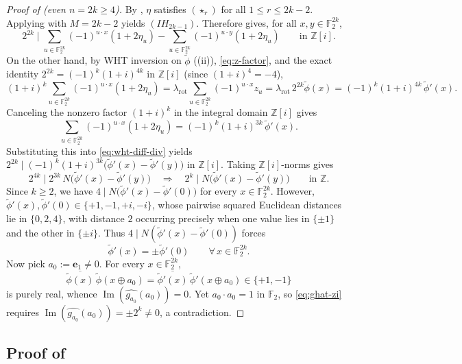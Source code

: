 \documentclass[11pt,a4paper]{article}
\theoremstyle{plain}
\theoremstyle{definition}
\theoremstyle{remark}
\newcommand{\Z}{\mathbb{Z}}
\newcommand{\F}{\mathbb{F}}
\newcommand{\Zi}{\mathbb{Z}[i]}
\newcommand{\ImPart}{\operatorname{Im}}
\numberwithin{equation}{section}
\begin{document}
\begin{proof}[Proof of  (even $n = 2k \ge 4$)]
By , $\eta$ satisfies $(\star_r)$ for all $1 \le r \le 2k - 2$. Applying  with $M = 2k - 2$ yields $(IH_{2k-1})$. Therefore  gives, for all $x, y \in \F_2^{2k}$,
\begin{equation}\label{eq:wht-diff-div}
  2^{2k} \;\Big|\; \sum_{u \in \F_2^{2k}} (-1)^{u \cdot x}(1 + 2\eta_u) - \sum_{u \in \F_2^{2k}} (-1)^{u \cdot y}(1 + 2\eta_u) \qquad \text{in } \Zi.
\end{equation}
On the other hand, by WHT inversion on $\tilde{\phi}$ ((ii)), \eqref{eq:z-factor}, and the exact identity $2^{2k} = (-1)^k (1+i)^{4k}$ in $\Zi$ (since $(1+i)^4 = -4$),
\[
  (1+i)^k \sum_{u \in \F_2^{2k}} (-1)^{u \cdot x}(1 + 2\eta_u)
  = \lambda_{\mathrm{rot}} \sum_{u \in \F_2^{2k}} (-1)^{u \cdot x} z_u
  = \lambda_{\mathrm{rot}}\,2^{2k}\tilde{\phi}(x)
  = (-1)^k (1+i)^{4k}\,\tilde{\phi}'(x).
\]
Canceling the nonzero factor $(1+i)^k$ in the integral domain $\Zi$ gives
\[
  \sum_{u \in \F_2^{2k}} (-1)^{u \cdot x}(1 + 2\eta_u) = (-1)^k (1+i)^{3k}\,\tilde{\phi}'(x).
\]
Substituting this into \eqref{eq:wht-diff-div} yields $2^{2k} \mid (-1)^k (1+i)^{3k}\bigl(\tilde{\phi}'(x) - \tilde{\phi}'(y)\bigr)$ in $\Zi$. Taking $\Zi$-norms gives
\[
  2^{4k} \;\Big|\; 2^{3k}\, N\bigl(\tilde{\phi}'(x) - \tilde{\phi}'(y)\bigr)
  \quad \Longrightarrow \quad
  2^k \;\Big|\; N\bigl(\tilde{\phi}'(x) - \tilde{\phi}'(y)\bigr) \qquad \text{in } \Z.
\]
Since $k \ge 2$, we have $4 \mid N\bigl(\tilde{\phi}'(x) - \tilde{\phi}'(0)\bigr)$ for every $x \in \F_2^{2k}$. However, $\tilde{\phi}'(x), \tilde{\phi}'(0) \in \{+1, -1, +i, -i\}$, whose pairwise squared Euclidean distances lie in $\{0, 2, 4\}$, with distance $2$ occurring precisely when one value lies in $\{\pm 1\}$ and the other in $\{\pm i\}$. Thus $4 \mid N(\tilde{\phi}'(x) - \tilde{\phi}'(0))$ forces
\[
  \tilde{\phi}'(x) = \pm \tilde{\phi}'(0) \qquad \forall\, x \in \F_2^{2k}.
\]
Now pick $a_0 := \mathbf{e}_1 \neq 0$. For every $x \in \F_2^{2k}$,
\[
  \overline{\tilde{\phi}(x)}\,\tilde{\phi}(x \oplus a_0) = \overline{\tilde{\phi}'(x)}\,\tilde{\phi}'(x \oplus a_0) \in \{+1, -1\}
\]
is purely real, whence $\ImPart(\widehat{g_{a_0}}(a_0)) = 0$. Yet $a_0 \cdot a_0 = 1$ in $\F_2$, so \eqref{eq:ghat-zi} requires $\ImPart(\widehat{g_{a_0}}(a_0)) = \pm 2^k \neq 0$, a contradiction.
\end{proof}

\subsection{Proof of \texorpdfstring{}{Corollary 1}}\label{sec:proof-gowers}
\end{document}
